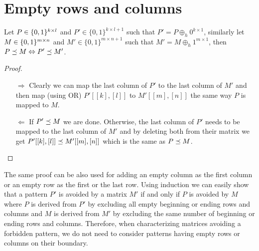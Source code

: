 \section{Empty rows and columns}
\begin{obs}
\label{emptyrows}
Let $P\in\{0,1\}^{k\times l}$ and $P'\in\{0,1\}^{k\times l+1}$ such that $P'=P\oplus_h0^{k\times1}$, similarly let $M\in\{0,1\}^{m\times n}$ and $M'\in\{0,1\}^{m\times n+1}$ such that $M'=M\oplus_h1^{m\times1}$, then $P\preceq M\Leftrightarrow P'\preceq M'$.
\end{obs}
\begin{proof}
\begin{itemize}
\item[$\Rightarrow$] Clearly we can map the last column of $P'$ to the last column of $M'$ and then map (using OR) $P'[[k],[l]]$ to $M'[[m],[n]]$ the same way $P$ is mapped to $M$.
\item[$\Leftarrow$] If $P'\preceq M$ we are done. Otherwise, the last column of $P'$ needs to be mapped to the last column of $M'$ and by deleting both from their matrix we get $P'[[k],[l]]\preceq M'[[m],[n]]$ which is the same as $P\preceq M$.
\end{itemize}
\end{proof}

The same proof can be also used for adding an empty column as the first column or an empty row as the first or the last row. Using induction we can easily show that a pattern $P'$ is avoided by a matrix $M'$ if and only if $P$ is avoided by $M$ where $P$ is derived from $P'$ by excluding all empty beginning or ending rows and columns and $M$ is derived from $M'$ by excluding the same number of beginning or ending rows and columns. Therefore, when characterizing matrices avoiding a forbidden pattern, we do not need to consider patterns having empty rows or columns on their boundary.

